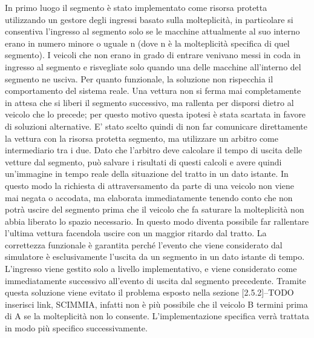 In primo luogo il segmento è stato implementato come risorsa protetta utilizzando un gestore degli ingressi basato sulla molteplicità, in particolare si consentiva l'ingresso al segmento solo se le macchine attualmente al suo interno erano in numero minore o uguale n (dove n è la molteplicità specifica di quel segmento). I veicoli che non erano in grado di entrare venivano messi in coda in ingresso al segmento e risvegliate solo quando una delle macchine all'interno del segmento ne usciva.
Per quanto funzionale, la soluzione non rispecchia il comportamento del sistema reale. Una vettura non si ferma mai completamente in attesa che si liberi il segmento successivo, ma rallenta per disporsi dietro al veicolo che lo precede; per questo motivo questa ipotesi è stata scartata in favore di soluzioni alternative.
E' stato scelto quindi di non far comunicare direttamente la vettura con la risorsa protetta segmento, ma utilizzare un arbitro come intermediario tra i due. Dato che l'arbitro deve calcolare il tempo di uscita delle vetture dal segmento, può salvare i risultati di questi calcoli e avere quindi un'immagine in tempo reale della situazione del tratto in un dato istante. In questo modo la richiesta di attraversamento da parte di una veicolo non viene mai negata o accodata, ma elaborata immediatamente tenendo conto che non potrà uscire del segmento prima che il veicolo che fa saturare la molteplicità non abbia liberato lo spazio necessario. In questo modo diventa possibile far rallentare l'ultima vettura facendola uscire con un maggior ritardo dal tratto.
La correttezza funzionale è garantita perché l'evento che viene considerato dal simulatore è esclusivamente l'uscita da un segmento in un dato istante di tempo. L'ingresso viene gestito solo a livello implementativo, e viene considerato come immediatamente successivo all'evento di uscita dal segmento precedente.
Tramite questa soluzione viene evitato il problema esposto nella sezione [2.5.2]--TODO inserisci link, SCIMMIA, infatti non è più possibile che il veicolo B termini prima di A se la molteplicità non lo consente.
L'implementazione specifica verrà trattata in modo più specifico successivamente.